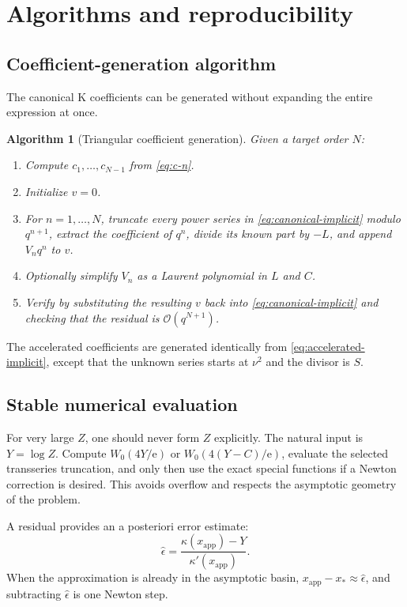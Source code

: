 \documentclass[11pt,a4paper]{article}
\numberwithin{equation}{section}
\newtheorem{algorithm}[theorem]{Algorithm}
\theoremstyle{remark}
\newcommand{\e}{\mathrm e}
\newcommand{\bigO}{\mathcal O}
\begin{document}
\section{Algorithms and reproducibility}
\label{sec:algorithms}

\subsection{Coefficient-generation algorithm}

The canonical K coefficients can be generated without expanding the entire
expression at once.

\begin{algorithm}[Triangular coefficient generation]
\label{alg:triangular}
Given a target order \(N\):
\begin{enumerate}
\item Compute \(c_1,\ldots,c_{N-1}\) from \cref{eq:c-n}.
\item Initialize \(v=0\).
\item For \(n=1,\ldots,N\), truncate every power series in
\cref{eq:canonical-implicit} modulo \(q^{n+1}\), extract the coefficient of
\(q^n\), divide its known part by \(-L\), and append \(V_nq^n\) to \(v\).
\item Optionally simplify \(V_n\) as a Laurent polynomial in \(L\) and
\(C\).
\item Verify by substituting the resulting \(v\) back into
\cref{eq:canonical-implicit} and checking that the residual is
\(\bigO(q^{N+1})\).
\end{enumerate}
\end{algorithm}

The accelerated coefficients are generated identically from
\cref{eq:accelerated-implicit}, except that the unknown series starts at
\(\nu^2\) and the divisor is \(S\).

\subsection{Stable numerical evaluation}

For very large \(Z\), one should never form \(Z\) explicitly.  The natural
input is \(Y=\log Z\).  Compute \(W_0(4Y/\e)\) or
\(W_0(4(Y-C)/\e)\), evaluate the selected transseries truncation, and only
then use the exact special functions if a Newton correction is desired.
This avoids overflow and respects the asymptotic geometry of the problem.

A residual provides an a posteriori error estimate:
\begin{equation}
\widehat\epsilon=
\frac{\kappa(x_{\mathrm{app}})-Y}{\kappa'(x_{\mathrm{app}})}.
\label{eq:posteriori}
\end{equation}
When the approximation is already in the asymptotic basin,
\(x_{\mathrm{app}}-x_*\approx\widehat\epsilon\), and subtracting
\(\widehat\epsilon\) is one Newton step.
\end{document}
